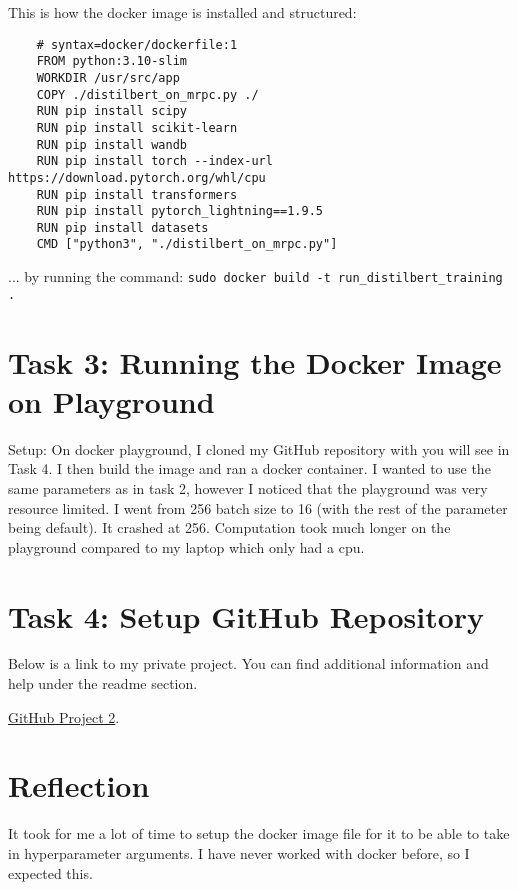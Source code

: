 \documentclass{article}
\begin{document}
This is how the docker image is installed and structured:

\begin{lstlisting}
    # syntax=docker/dockerfile:1
    FROM python:3.10-slim
    WORKDIR /usr/src/app
    COPY ./distilbert_on_mrpc.py ./ 
    RUN pip install scipy
    RUN pip install scikit-learn
    RUN pip install wandb
    RUN pip install torch --index-url https://download.pytorch.org/whl/cpu
    RUN pip install transformers 
    RUN pip install pytorch_lightning==1.9.5 
    RUN pip install datasets
    CMD ["python3", "./distilbert_on_mrpc.py"]
    \end{lstlisting}
... by running the command: 
\verb!sudo docker build -t run_distilbert_training .!

\section{Task 3: Running the Docker Image on Playground}
Setup: On docker playground, I cloned my GitHub repository with you will see in Task 4. 
I then build the image and ran a docker container. I wanted to use the same parameters as in task 2, 
however I noticed that the playground was very resource limited. I went from 256 batch size to 16 (with the rest of the parameter being default). It crashed at 256.
Computation took much longer on the playground compared to my laptop which only had a cpu.





\section{Task 4: Setup GitHub Repository}
Below is a link to my private project. You can find additional information and help under the readme section.


\href{https://github.com/JDCarona/project2-mlops}{GitHub Project 2}.




\section{Reflection}
It took for me a lot of time to setup the docker image file for it to be able to take in hyperparameter arguments.
I have never worked with docker before, so I expected this. 
\end{document}
